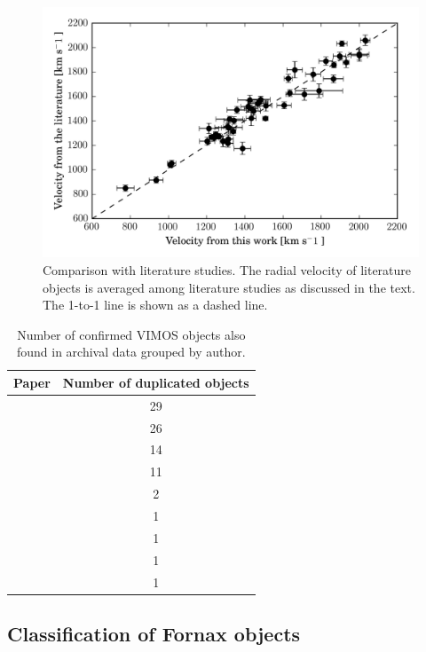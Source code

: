 \documentclass[useAMS,usenatbib]{mn2e}
\begin{document}
\begin{figure}
\centering
\includegraphics[width=\columnwidth]{figures/vel_literature.png} 
\caption{Comparison with literature studies. The radial velocity of literature 
objects is averaged among literature studies as discussed in the text. The 1-to-1 
line is shown as a dashed line. }
\label{fig:vel_comparison}
\end{figure}
 
\begin{table}
\centering
\label{mathmode}
\begin{tabular}{@{}l c}
\hline
Paper & Number of duplicated objects \\
\hline
\citet{Dirsch04}       &  29 \\
\citet{Schuberth}      &  26 \\
\citet{Bergond07}      &  14 \\
\citet{Firth07}        &  11 \\
\citet{Chilingarian11} &  2  \\
\citet{Mieske04}       &  1  \\
\citet{Hilker07}       &  1  \\
\citet{Francis12}      &  1  \\
\citet{Drinkwater00}   &  1  \\
\hline
\end{tabular}
\caption{Number of confirmed VIMOS objects also found in archival data grouped 
by author.}
\label{tab:authors} 
\end{table}

\subsection{Classification of Fornax objects}
\end{document}
